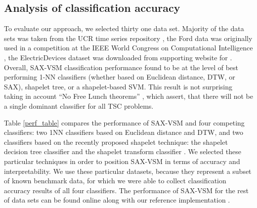 \documentclass{llncs}
\begin{document}
\subsection{Analysis of classification accuracy}
To evaluate our approach, we selected thirty one data set. Majority of the data sets was taken 
from the UCR time series repository \cite{ucr}, the Ford data was originally used in a competition
at the IEEE World Congress on Computational Intelligence \cite{ford}, the ElectricDevices
dataset was downloaded from supporting website for \cite{bagnal}. Overall, SAX-VSM classification 
performance found to be at the level of best performing 1-NN classifiers (whether based on 
Euclidean distance, DTW, or SAX), shapelet tree, or a shapelet-based SVM. 
This result is not surprising taking in account ``No Free Lunch theorems'' \cite{nfl}, which 
assert, that there will not be a single dominant classifier for all TSC problems.

Table \ref{perf_table} compares the performance of SAX-VSM and four competing classifiers: 
two 1NN classifiers based on Euclidean distance and DTW, and two classifiers 
based on the recently proposed shapelet technique: the shapelet decision tree
\cite{shapelet, logical} 
classifier and the shapelet transform classifier \cite{bagnal}. 
We selected these particular 
techniques in order to position SAX-VSM in terms of accuracy and interpretability. 
We use these particular datasets, because they represent a subset of known benchmark data, 
for which we were able to collect classification accuracy results of all four classifiers. 
The performance of SAX-VSM for the rest of data sets can be found online along with 
our reference implementation \cite{jmotif}.
\end{document}
